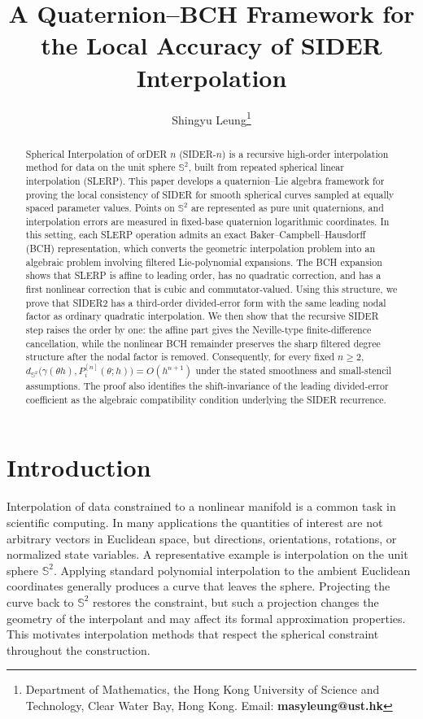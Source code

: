 \documentclass[a4paper,11pt]{article}
\title{A Quaternion--BCH Framework for the Local Accuracy of SIDER Interpolation}
\author{
Shingyu Leung\thanks{Department of Mathematics, the Hong Kong University of Science and Technology, Clear Water Bay, Hong Kong. Email: {\bf masyleung@ust.hk}}
}
\date{}
\newcommand{\bS}{\mathbb{S}}
\numberwithin{equation}{section}
\theoremstyle{plain}
\theoremstyle{definition}
\theoremstyle{remark}
\begin{document}
\maketitle

\begin{abstract}
Spherical Interpolation of orDER \(n\) (SIDER-\(n\)) is a recursive
high-order interpolation method for data on the unit sphere \(\bS^2\), built
from repeated spherical linear interpolation (SLERP).  This paper develops a
quaternion--Lie algebra framework for proving the local consistency of SIDER
for smooth spherical curves sampled at equally spaced parameter values.  Points
on \(\bS^2\) are represented as pure unit quaternions, and interpolation errors
are measured in fixed-base quaternion logarithmic coordinates.  In this
setting, each SLERP operation admits an exact Baker--Campbell--Hausdorff
(BCH) representation, which converts the geometric interpolation problem into
an algebraic problem involving filtered Lie-polynomial expansions.  The BCH
expansion shows that SLERP is affine to leading order, has no quadratic
correction, and has a first nonlinear correction that is cubic and
commutator-valued.  Using this structure, we prove that SIDER2 has a
third-order divided-error form with the same leading nodal factor as ordinary
quadratic interpolation.  We then show that the recursive SIDER step raises
the order by one: the affine part gives the Neville-type finite-difference
cancellation, while the nonlinear BCH remainder preserves the sharp filtered
degree structure after the nodal factor is removed.  Consequently, for every
fixed \(n\geq2\),
$
        d_{\bS^2}\bigl(\gamma(\theta h),P_i^{[n]}(\theta;h)\bigr)
        =
        O(h^{n+1})
$
under the stated smoothness and small-stencil assumptions.  The proof also
identifies the shift-invariance of the leading divided-error coefficient as
the algebraic compatibility condition underlying the SIDER recurrence.
\end{abstract}

\section{Introduction}

Interpolation of data constrained to a nonlinear manifold is a common task in
scientific computing.  In many applications the quantities of interest are not
arbitrary vectors in Euclidean space, but directions, orientations, rotations,
or normalized state variables.  A representative example is interpolation on
the unit sphere \(\bS^2\).  Applying standard polynomial interpolation to the
ambient Euclidean coordinates generally produces a curve that leaves the
sphere.  Projecting the curve back to \(\bS^2\) restores the constraint, but
such a projection changes the geometry of the interpolant and may affect its
formal approximation properties.  This motivates interpolation methods that
respect the spherical constraint throughout the construction.
\end{document}
